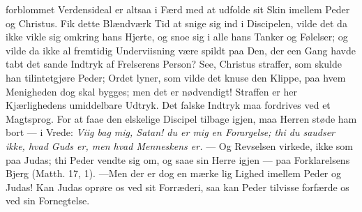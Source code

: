 \documentclass[12pt,a4paper]{book}
\begin{document}
forblommet Verdensideal er altsaa i Færd med at udfolde sit Skin imellem Peder og
Christus. Fik dette Blændværk Tid at snige sig ind i Discipelen, vilde det da ikke vikle
sig omkring hans Hjerte, og snoe sig i alle hans Tanker og Følelser; og vilde da ikke al
fremtidig Underviisning være spildt paa Den, der een Gang havde tabt det sande Indtryk af
Frelserens Person? See, Christus straffer, som skulde han tilintetgjøre Peder; Ordet
lyner, som vilde det knuse den Klippe, paa hvem Menigheden dog skal bygges; men det er
nødvendigt! Straffen er her Kjærlighedens umiddelbare Udtryk. Det falske Indtryk maa
fordrives ved et Magtsprog. For at faae den elskelige Discipel tilbage igjen, maa Herren
støde ham bort --- i Vrede: \emph{Viig bag mig, Satan! du er mig en Forargelse; thi du
saudser ikke, hvad Guds er, men hvad Menneskens er.} --- Og Revselsen virkede, ikke som
paa Judas; thi Peder vendte sig om, og saae sin Herre igjen --- paa Forklarelsens Bjerg
(Matth. 17, 1). ---Men der er dog en mærke\-%
lig Lighed imellem Peder og Judas! Kan Judas oprøre os ved sit Forræderi, saa kan Peder
tilvisse forfærde os ved sin Fornegtelse.
\end{document}
